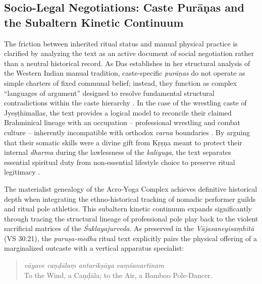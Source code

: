 \documentclass[11pt,twoside,letterpaper]{article}
\begin{document}
\subsection{Socio-Legal Negotiations: Caste Purāṇas and the Subaltern Kinetic Continuum}
The friction between inherited ritual status and manual physical practice is clarified by analyzing the text as an active document of social negotiation rather than a neutral historical record. As Das establishes in her structural analysis of the Western Indian manual tradition, caste-specific \textit{purāṇas} do not operate as simple charters of fixed communal belief; instead, they function as complex ``languages of argument'' designed to resolve fundamental structural contradictions within the caste hierarchy \citep{Das1968}. In the case of the wrestling caste of Jyeṣṭhīmallas, the text provides a logical model to reconcile their claimed Brahminical lineage with an occupation -- professional wrestling and combat culture -- inherently incompatible with orthodox \textit{varna} boundaries \citep{Das1968}. By arguing that their somatic skills were a divine gift from Kṛṣṇa meant to protect their internal \textit{dharma} during the lawlessness of the \textit{kaliyuga}, the text separates essential spiritual duty from non-essential lifestyle choice to preserve ritual legitimacy \citep{Das1968}.

The materialist genealogy of the Acro-Yoga Complex achieves definitive historical depth when integrating the ethno-historical tracking of nomadic performer guilds and ritual pole athletics. This subaltern kinetic continuum expands significantly through tracing the structural lineage of professional pole play back to the violent sacrificial matrices of the \textit{Śuklayajurveda}. As preserved in the \textit{Vājasaneyisaṃhitā} (VS 30.21), the \textit{puruṣa-medha} ritual text explicitly pairs the physical offering of a marginalized outcaste with a vertical apparatus specialist: 

\begin{quote}
\textit{vāyave caṇḍālaṃ antarikṣāya vaṃśanartinam}\\
To the Wind, a Caṇḍāla; to the Air, a Bamboo Pole-Dancer.\\
\end{quote} 
\end{document}
